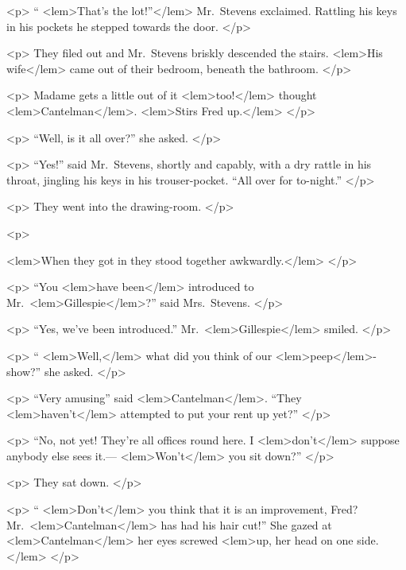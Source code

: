{{				<p>
				“
<lem>That's the lot!”</lem>
					{} 
				Mr.\ Stevens exclaimed. Rattling his keys in his pockets he stepped towards the door. 
 				</p> 

				<p>
				They filed out and Mr.\ Stevens briskly descended the stairs. 
<lem>His wife</lem>
					{} 
				came out of their 
				bedroom, beneath the bathroom. 
 				</p> 

				<p>
				Madame gets a little out of it 
<lem>too!</lem>
					{} 
				thought 
<lem>Cantelman</lem>{}. 
<lem>Stirs Fred up.</lem>
					{} 
 				</p> 

				<p>
				“Well, is it all over?” she asked. 
 				</p> 

				<p>
				“Yes!” said Mr.\ Stevens, shortly and capably, with a dry rattle in his throat, jingling 
				his keys in his trouser-pocket. “All over for to-night.” 
 				</p> 

				<p>
				They went into the drawing-room. 
				</p> 

				<p>

<lem>When they got in they stood together awkwardly.</lem>
					{} 
 				</p> 

				<p>
				“You 
<lem>have been</lem>
					{} 
				introduced to Mr.\ 
<lem>Gillespie</lem>{}?” said Mrs.\ Stevens. 
 				</p> 

				<p>
				“Yes, we've been introduced.” Mr.\ 
<lem>Gillespie</lem>{} smiled. 
 				</p> 

				<p>
				“
<lem>Well,</lem>
					{} 
				what did you think of our 
<lem>peep</lem>{}-show?” she asked. 
 				</p> 

				<p>
				“Very amusing” said 
<lem>Cantelman</lem>{}. “They 
<lem>haven't</lem>
					{} 
				attempted to put your rent up yet?” 
 				</p> 

				<p>
				“No, not yet! They're all offices round here. I 
<lem>don't</lem>{} suppose anybody else sees 
				it.---
<lem>Won't</lem>{\Afootnote{Wont}} you sit down?” 
 				</p> 

				<p>
				They sat down. 
 				</p> 

				<p>
				“
<lem>Don't</lem>{} you think that it is an improvement, Fred? Mr.\ 
<lem>Cantelman</lem>{} has had his hair 
				cut!” She gazed at 
<lem>Cantelman</lem>{\Afootnote{Cantleman}} her eyes screwed 
<lem>up, her head on one side.</lem>{\Bfootnote{up.}} 
 				</p> 

}}
